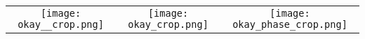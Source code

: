 \begin{tabular}{c @{\hskip 0pt} c @{\hskip 0pt} c }
    \texttt{[image: okay\_\_crop.png]}&
    \texttt{[image: okay\_crop.png]}&
    \texttt{[image: okay\_phase\_crop.png]}
\end{tabular}